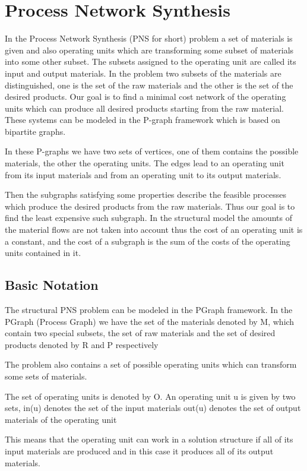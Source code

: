 \section{ Process Network Synthesis }

In the Process Network Synthesis (PNS for short) problem a set of materials is given and also operating units 
which are transforming some subset of materials into some other subset.
The subsets assigned to the operating unit are called its  input and output materials. 
In the problem two subsets of the materials are distinguished, 
one is the set of the raw materials and the other is the set of the desired products.
Our goal is to find a minimal cost network of the operating units which can produce all desired products starting from the raw material. These systems can be modeled in the P-graph framework which is based on bipartite graphs.


In these P-graphs we have two sets of vertices, one of them contains the possible materials,
the other the operating units. The edges lead to an operating unit from its input materials 
and from an operating unit to its output materials. 


Then the subgraphs satisfying some properties describe the feasible processes
which produce the desired products from the raw materials.
Thus our goal is to find the least expensive such subgraph. 
In the structural model the amounts of the material flows are not taken into account thus the cost of an operating unit is a constant, and the cost of a subgraph is the sum of the costs of the operating units contained in it. 
\subsection{ Basic Notation }

The structural PNS problem can be modeled in the PGraph framework.
In the PGraph (Process Graph) we have the set of the materials denoted by M,
which contain two special subsets, the set of raw materials and the set of desired products denoted by R and P respectively

The problem also contains a set of possible operating units which can transform some sets of materials. 

The set of operating units is denoted by O. An operating unit u is given by two sets, 
in(u) denotes the set of the input materials out(u) denotes the set of output materials of the operating unit

This means that the operating unit can work in a solution structure if all of its input materials are produced and in this case it 
produces all of its output materials. 

